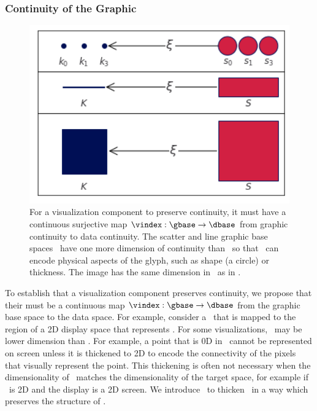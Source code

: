 \documentclass[../main.tex]{subfiles}
\begin{document}
\subsubsection{Continuity of the Graphic \gbase} 
\label{sec:math:graphic:base}
\begin{figure}[H]
    \includegraphics[width=1\textwidth]{figures/math/retraction_maps.png}
    \caption{For a visualization component to preserve continuity, it must have a continuous surjective map $\vindex: \gbase\rightarrow\dbase$ from graphic continuity to data continuity. The scatter and line graphic base spaces \gbase\ have one more dimension of continuity than \dbase\ so that \gbase\ can encode physical aspects of the glyph, such as shape (a circle) or thickness. The image has the same dimension in \gbase\ as in \dbase.}
    \label{fig:math:graphic:retraction:map}
\end{figure}
To establish that a visualization component preserves continuity, we propose that their must be a continuous map $\vindex: \gbase\rightarrow\dbase$ from the graphic base space to the data space. For example, consider a \gbase\ that is mapped to the region of a 2D display space that represents \dbase. For some visualizations, \dbase\ may be lower dimension than \gbase. For example, a point that is 0D in \dbase\ cannot be represented on screen unless it is thickened to 2D to encode the connectivity of the pixels that visually represent the point. This thickening is often not necessary when the dimensionality of \dbase\ matches the dimensionality of the target space, for example if \dbase\ is 2D and the display is a 2D screen. We introduce \gbase\ to thicken \dbase\ in a way which preserves the structure of \dbase. 
\end{document}
